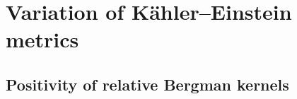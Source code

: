 \documentclass[a4paper, 11pt]{amsart}
\theoremstyle{plain}
\newtheorem{theorem}{Theorem}[section]
\numberwithin{equation}{section} %
\numberwithin{figure}{section} %
\theoremstyle{plain}
\theoremstyle{plain}
\theoremstyle{plain}
\theoremstyle{plain}
\theoremstyle{remark}
\theoremstyle{definition}
\theoremstyle{definition}
\newtheorem{definition}[theorem]{Definition}
\newcommand{\K}{\mathcal{K}}
\begin{document}


\section{Variation of K\"ahler--Einstein metrics}
\label{sect: pos-variation}
\subsection{Positivity of relative Bergman kernels}
\end{document}

